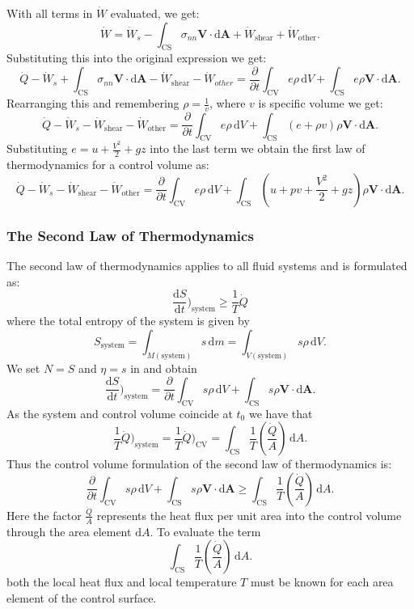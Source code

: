 With all terms in $\dot{W}$ evaluated, we get:
\[ 
\dot{W} = \dot{W}_s - \int_{\mathrm{CS}} \sigma_{nn} \textbf{V} \cdot \mathrm{d} \textbf{A} + \dot{W}_{\mathrm{shear}} + \dot{W}_{\mathrm{other}}
.\]
Substituting this into the original expression we get:
\[ 
\dot{Q} - \dot{W}_s + \int_{\mathrm{CS}} \sigma_{nn} \textbf{V} \cdot \mathrm{d}\textbf{A} - \dot{W}_{\mathrm{shear}} - \dot{W}_{other} = \frac{\partial }{\partial t} \int_{\mathrm{CV}} e \rho \, \mathrm{d}V + \int_{\mathrm{CS}} e \rho \textbf{V} \cdot \mathrm{d}\textbf{A}
.\]
Rearranging this and remembering $\rho = \frac{1}{v}$, where $v$ is specific volume we get:
\[ 
\dot{Q} - \dot{W}_s - \dot{W}_{\mathrm{shear}} - \dot{W}_{\mathrm{other}} = \frac{\partial }{\partial t}\int_{\mathrm{CV}} e \rho \, \mathrm{d}V + \int_{\mathrm{CS}} \left( e + \rho v \right)\rho \textbf{V} \cdot \mathrm{d}\textbf{A}
.\]
Substituting $e = u + \frac{V^2}{2} + gz$ into the last term we obtain the first law of thermodynamics for a control volume as:
\[ 
\dot{Q} - \dot{W}_s - \dot{W}_{\mathrm{shear}} - \dot{W}_{\mathrm{other}} = \frac{\partial }{\partial t} \int_{\mathrm{CV}} e \rho \, \mathrm{d}V + \int_{\mathrm{CS}} \left( u + p v + \frac{V^2}{2} + gz \right) \rho \textbf{V} \cdot \mathrm{d}\textbf{A}
.\]


\subsubsection{The Second Law of Thermodynamics}
The second law of thermodynamics applies to all fluid systems and is formulated as:
\[ 
\frac{\mathrm{d}S}{\mathrm{d}t} \bigg)_{\mathrm{system}} \geq \frac{1}{T} \dot{Q}
\]
where the total entropy of the system is given by
\[ 
S_{\mathrm{system}} = \int_{M (\mathrm{system})} s \, \mathrm{d}m = \int_{V (\mathrm{system})} s \rho \, \mathrm{d}V
.\]
We set $N = S$ and $\eta = s$ in  and obtain
\[ 
\frac{\mathrm{d}S}{\mathrm{d}t} \bigg)_{\mathrm{system}} = \frac{\partial }{\partial t} \int_{\mathrm{CV}} s \rho \, \mathrm{d}V + \int_{\mathrm{CS}} s \rho \textbf{V} \cdot \mathrm{d}\textbf{A}
.\]
As the system and control volume coincide at $t_0$ we have that
\[ 
  \frac{1}{T} \dot{Q})_{\mathrm{system}} = \frac{1}{T}\dot{Q})_{\mathrm{CV}} = \int_{\mathrm{CS}} \frac{1}{T} \left( \frac{\dot{Q}}{A} \right) \, \mathrm{d}A 
.\]
Thus the control volume formulation of the second law of thermodynamics is:
\[ 
\frac{\partial }{\partial t} \int_{\mathrm{CV}} s \rho \, \mathrm{d}V + \int_{\mathrm{CS}} s \rho \textbf{V} \cdot \mathrm{d} \textbf{A} \geq \int_{\mathrm{CS}} \frac{1}{T} \left( \frac{\dot{Q}}{A} \right) \, \mathrm{d}A
.\]
Here the factor $\frac{\dot{Q}}{A}$ represents the heat flux per unit area into the control volume through the area element $\mathrm{d}A$. To evaluate the term
\[ 
\int_{\mathrm{CS}} \frac{1}{T} \left( \frac{\dot{Q}}{A} \right) \, \mathrm{d}A
.\]
both the local heat flux and local temperature $T$ must be known for each area element of the control surface.
